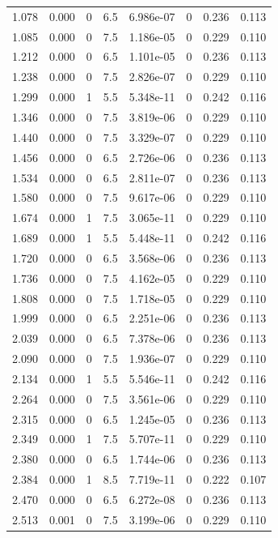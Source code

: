 \documentclass[preview]{standalone}
\begin{document}
{{\begin{tabular}{L{1.2cm}C{1.2cm} C{0.3cm}C{0.5cm} C{1.4cm}C{1.4cm} C{1.4cm}C{1.4cm}}
  1.078  &  0.000  & 0     & 6.5 &  6.986e-07  & 0  & 0.236 &  0.113   \\ 
  1.085  &  0.000  & 0     & 7.5 &  1.186e-05  & 0  & 0.229 &  0.110   \\ 
  1.212  &  0.000  & 0     & 6.5 &  1.101e-05  & 0  & 0.236 &  0.113   \\ 
  1.238  &  0.000  & 0     & 7.5 &  2.826e-07  & 0  & 0.229 &  0.110   \\ 
  1.299  &  0.000  & 1     & 5.5 &  5.348e-11  & 0  & 0.242 &  0.116   \\ 
  1.346  &  0.000  & 0     & 7.5 &  3.819e-06  & 0  & 0.229 &  0.110   \\ 
  1.440  &  0.000  & 0     & 7.5 &  3.329e-07  & 0  & 0.229 &  0.110   \\ 
  1.456  &  0.000  & 0     & 6.5 &  2.726e-06  & 0  & 0.236 &  0.113   \\ 
  1.534  &  0.000  & 0     & 6.5 &  2.811e-07  & 0  & 0.236 &  0.113   \\ 
  1.580  &  0.000  & 0     & 7.5 &  9.617e-06  & 0  & 0.229 &  0.110   \\ 
  1.674  &  0.000  & 1     & 7.5 &  3.065e-11  & 0  & 0.229 &  0.110   \\ 
  1.689  &  0.000  & 1     & 5.5 &  5.448e-11  & 0  & 0.242 &  0.116   \\ 
  1.720  &  0.000  & 0     & 6.5 &  3.568e-06  & 0  & 0.236 &  0.113   \\ 
  1.736  &  0.000  & 0     & 7.5 &  4.162e-05  & 0  & 0.229 &  0.110   \\ 
  1.808  &  0.000  & 0     & 7.5 &  1.718e-05  & 0  & 0.229 &  0.110   \\ 
  1.999  &  0.000  & 0     & 6.5 &  2.251e-06  & 0  & 0.236 &  0.113   \\ 
  2.039  &  0.000  & 0     & 6.5 &  7.378e-06  & 0  & 0.236 &  0.113   \\ 
  2.090  &  0.000  & 0     & 7.5 &  1.936e-07  & 0  & 0.229 &  0.110   \\ 
  2.134  &  0.000  & 1     & 5.5 &  5.546e-11  & 0  & 0.242 &  0.116   \\ 
  2.264  &  0.000  & 0     & 7.5 &  3.561e-06  & 0  & 0.229 &  0.110   \\ 
  2.315  &  0.000  & 0     & 6.5 &  1.245e-05  & 0  & 0.236 &  0.113   \\ 
  2.349  &  0.000  & 1     & 7.5 &  5.707e-11  & 0  & 0.229 &  0.110   \\ 
  2.380  &  0.000  & 0     & 6.5 &  1.744e-06  & 0  & 0.236 &  0.113   \\ 
  2.384  &  0.000  & 1     & 8.5 &  7.719e-11  & 0  & 0.222 &  0.107   \\ 
  2.470  &  0.000  & 0     & 6.5 &  6.272e-08  & 0  & 0.236 &  0.113   \\ 
  2.513  &  0.001  & 0     & 7.5 &  3.199e-06  & 0  & 0.229 &  0.110   \\ 
\hline 
\end{tabular} 

}}
\end{document}
